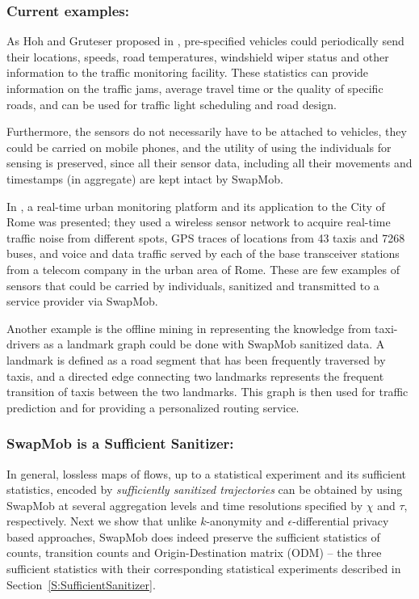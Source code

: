 \documentclass{llncs}
\begin{document}
\subsubsection{Current examples:}
As Hoh and Gruteser proposed in \cite{Hoh2005}, pre-specified vehicles could periodically send their locations, speeds, road temperatures, windshield wiper status and other information to the traffic monitoring facility. These statistics can provide information on the traffic jams, average travel time or the quality of specific roads, and can be used for traffic light scheduling and road design.

Furthermore, the sensors do not necessarily have to be attached to vehicles, they could be carried on mobile phones, and the utility of using the individuals for sensing is preserved, since all their sensor data, including all their movements and timestamps (in aggregate) are kept intact by SwapMob.


In \cite{Calabrese2011}, a real-time urban monitoring platform and its application to the City of Rome was presented; they used
a wireless sensor network to acquire real-time traffic noise from different spots, GPS traces of locations from 43 taxis and 7268 buses, and voice and data traffic served by each of the base transceiver stations from a telecom company in the urban area of Rome. These are few examples of sensors that could be carried by individuals, sanitized and transmitted to a service provider via SwapMob.

Another example is the offline mining in \cite{Yuan2011} representing the knowledge from taxi-drivers as a landmark graph could be done with SwapMob sanitized data. A landmark is defined as a road segment that has been frequently traversed by taxis, and a directed edge connecting two landmarks represents the frequent transition of taxis between the two landmarks. This graph is then used for traffic prediction and for providing a personalized routing service.

\subsubsection{SwapMob is a Sufficient Sanitizer:}
In general, lossless maps of flows, up to a statistical experiment and its sufficient statistics, encoded by {\em sufficiently sanitized trajectories} can be obtained by using SwapMob at several aggregation levels and time resolutions specified by $\chi$ and $\tau$, respectively.  
Next we show that unlike $k$-anonymity and $\epsilon$-differential privacy based approaches, SwapMob does indeed preserve the sufficient statistics of counts, transition counts and Origin-Destination matrix (ODM) -- the three sufficient statistics with their corresponding statistical experiments described in Section~\ref{S:SufficientSanitizer}.
\end{document}
